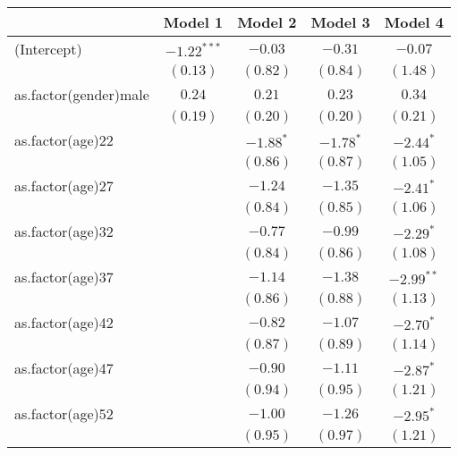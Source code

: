
\begin{table}[hb!]
\begin{center}
\begin{tabular}{l c c c c }
\toprule
 & Model 1 & Model 2 & Model 3 & Model 4 \\
\midrule
(Intercept)                  & $-1.22^{***}$ & $-0.03$     & $-0.31$     & $-0.07$      \\
                             & $(0.13)$      & $(0.82)$    & $(0.84)$    & $(1.48)$     \\
as.factor(gender)male        & $0.24$        & $0.21$      & $0.23$      & $0.34$       \\
                             & $(0.19)$      & $(0.20)$    & $(0.20)$    & $(0.21)$     \\
as.factor(age)22             &               & $-1.88^{*}$ & $-1.78^{*}$ & $-2.44^{*}$  \\
                             &               & $(0.86)$    & $(0.87)$    & $(1.05)$     \\
as.factor(age)27             &               & $-1.24$     & $-1.35$     & $-2.41^{*}$  \\
                             &               & $(0.84)$    & $(0.85)$    & $(1.06)$     \\
as.factor(age)32             &               & $-0.77$     & $-0.99$     & $-2.29^{*}$  \\
                             &               & $(0.84)$    & $(0.86)$    & $(1.08)$     \\
as.factor(age)37             &               & $-1.14$     & $-1.38$     & $-2.99^{**}$ \\
                             &               & $(0.86)$    & $(0.88)$    & $(1.13)$     \\
as.factor(age)42             &               & $-0.82$     & $-1.07$     & $-2.70^{*}$  \\
                             &               & $(0.87)$    & $(0.89)$    & $(1.14)$     \\
as.factor(age)47             &               & $-0.90$     & $-1.11$     & $-2.87^{*}$  \\
                             &               & $(0.94)$    & $(0.95)$    & $(1.21)$     \\
as.factor(age)52             &               & $-1.00$     & $-1.26$     & $-2.95^{*}$  \\
                             &               & $(0.95)$    & $(0.97)$    & $(1.21)$     \\

\end{tabular}
\end{center}
\end{table}
